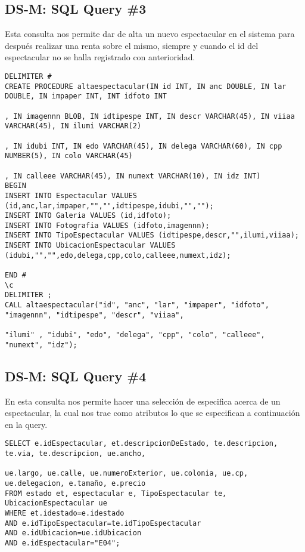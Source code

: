 \subsection{DS-M: SQL Query \#3}
Esta consulta nos permite dar de alta un nuevo espectacular en el sistema para después realizar una renta sobre el mismo, siempre y cuando el id del espectacular no se halla registrado con anterioridad.
\begin{verbatim}
DELIMITER #
CREATE PROCEDURE altaespectacular(IN id INT, IN anc DOUBLE, IN lar DOUBLE, IN impaper INT, INT idfoto INT

, IN imagennn BLOB, IN idtipespe INT, IN descr VARCHAR(45), IN viiaa VARCHAR(45), IN ilumi VARCHAR(2)

, IN idubi INT, IN edo VARCHAR(45), IN delega VARCHAR(60), IN cpp NUMBER(5), IN colo VARCHAR(45)

, IN calleee VARCHAR(45), IN numext VARCHAR(10), IN idz INT)
BEGIN
INSERT INTO Espectacular VALUES (id,anc,lar,impaper,"","",idtipespe,idubi,"","");
INSERT INTO Galeria VALUES (id,idfoto);
INSERT INTO Fotografia VALUES (idfoto,imagennn);
INSERT INTO TipoEspectacular VALUES (idtipespe,descr,"",ilumi,viiaa);
INSERT INTO UbicacionEspectacular VALUES (idubi,"","",edo,delega,cpp,colo,calleee,numext,idz);
	
END #
\c 
DELIMITER ;
CALL altaespectacular("id", "anc", "lar", "impaper", "idfoto", "imagennn", "idtipespe", "descr", "viiaa",

"ilumi" , "idubi", "edo", "delega", "cpp", "colo", "calleee", "numext", "idz");
\end{verbatim}
   
   
\subsection{DS-M: SQL Query \#4}
En esta consulta nos permite hacer una selección de especifica acerca de un espectacular, la cual nos trae como atributos lo que se especifican a continuación en la query.
\begin{verbatim}
SELECT e.idEspectacular, et.descripcionDeEstado, te.descripcion, te.via, te.descripcion, ue.ancho,

ue.largo, ue.calle, ue.numeroExterior, ue.colonia, ue.cp, ue.delegacion, e.tamaño, e.precio
FROM estado et, espectacular e, TipoEspectacular te, UbicacionEspectacular ue
WHERE et.idestado=e.idestado
AND e.idTipoEspectacular=te.idTipoEspectacular
AND e.idUbicacion=ue.idUbicacion
AND e.idEspectacular="E04";
\end{verbatim}


